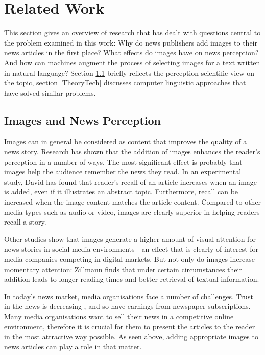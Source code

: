 \documentclass[11pt,a4paper,twoside]{article}
\begin{document}

\cleardoublepage

\section{Related Work}

This section gives an overview of research that has dealt with questions central to the problem examined in this work: Why do news publishers add images to their news articles in the first place? What effects do images have on news perception? And how can machines augment the process of selecting images for a text written in natural language? Section \ref{TheoryPerception} briefly reflects the perception scientific view on the topic, section \ref{TheoryTech} discusses computer linguistic approaches that have solved similar problems.

\subsection{Images and News Perception} \label{TheoryPerception}

Images can in general be considered as content that improves the quality of a news story. Research has shown that the addition of images enhances the reader's perception in a number of ways. The most significant effect is probably that images help the audience remember the news they read. In an experimental study, David has found that reader's recall of an article increases when an image is added, even if it illustrates an abstract topic. \cite[p. 197-199]{David1998NewsNews} Furthermore, recall can be increased when the image content matches the article content. \cite[p. 187-189]{David1998NewsNews} Compared to other media types such as audio or video, images are clearly superior in helping readers recall a story. \cite{Sundar2000MultimediaDownloads}

Other studies show that images generate a higher amount of visual attention for news stories in social media environments \cite{Keib2018PictureNews} - an effect that is clearly of interest for media companies competing in digital markets. But not only do images increase momentary attention: Zillmann finds that under certain circumstances their addition leads to longer reading times and better retrieval of textual information. \cite{Zillmann2001EffectsReports}

In today's news market, media organisations face a number of challenges. Trust in the news is decreasing \cite{Newman2017Reuters2017}, and so have earnings from newspaper subscriptions. Many media organisations want to sell their news in a competitive online environment, therefore it is crucial for them to present the articles to the reader in the most attractive way possible. As seen above, adding appropriate images to news articles can play a role in that matter.
\end{document}

